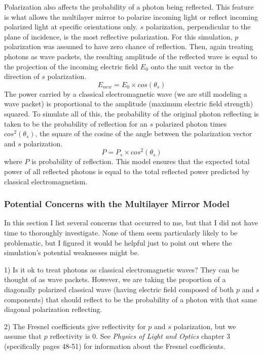 \documentclass[manuscript]{aastex}
\begin{document}
Polarization also affects the probability of a photon being reflected. This feature is what allows the multilayer mirror to polarize incoming light or reflect incoming polarized light at specific orientations only. $s$ polarization, perpendicular to the plane of incidence, is the most reflective polarization. For this simulation, $p$ polarization was assumed to have zero chance of reflection. Then, again treating photons as wave packets, the resulting amplitude of the reflected wave is equal to the projection of the incoming electric field $E_0$ onto the unit vector in the direction of $s$ polarization.
\begin{equation}
E_{new} = E_0 \times cos(\theta_s)
\end{equation}
The power carried by a classical electromagnetic wave (we are still modeling a wave packet) is proportional to the amplitude (maximum electric field strength) squared. To simulate all of this, the probability of the original photon reflecting is taken to be the probability of reflection for an $s$ polarized photon times $cos^2(\theta_s)$, the square of the cosine of the angle between the polarization vector and $s$ polarization.
\begin{equation}
P = P_s \times cos^2(\theta_s)
\end{equation}
where $P$ is probability of reflection. This model ensures that the expected total power of all reflected photons is equal to the total reflected power predicted by classical electromagnetism.

\subsubsection{Potential Concerns with the Multilayer Mirror Model}

In this section I list several concerns that occurred to me, but that I did not have time to thoroughly investigate. None of them seem particularly likely to be problematic, but I figured it would be helpful just to point out where the simulation's potential weaknesses might be.

1) Is it ok to treat photons as classical electromagnetic waves? They can be thought of as wave packets. However, we are taking the proportion of a diagonally polarized classical wave (having electric field composed of both $p$ and $s$ components) that should reflect to be the probability of a photon with that same diagonal polarization reflecting.

2) The Fresnel coefficients give reflectivity for $p$ and $s$ polarization, but we assume that $p$ reflectivity is 0. See \textit{Physics of Light and Optics} chapter 3 (specifically pages 48-51) for information about the Fresnel coefficients.
\end{document}
